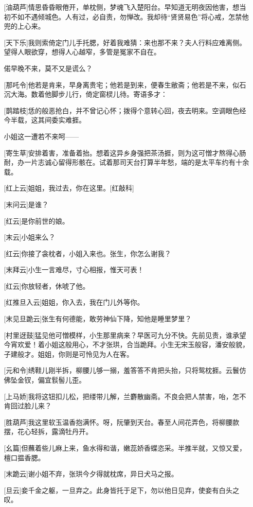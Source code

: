 \documentclass{book}
\begin{document}
[油葫芦]情思昏昏眼倦开，单枕侧，梦魂飞入楚阳台。早知道无明夜因他害，想当初不如不遇倾城色。人有过，必自责，勿惮改。我却待``贤贤易色''将心戒，怎禁他兜的上心来。

[天下乐]我则索倚定门儿手托腮，好着我难猜：来也那不来？夫人行料应难离侧。望得人眼欲穿，想得人心越窄，多管是冤家不自在。

偌早晚不来，莫不又是谎么？

[那吒令]他若是肯来，早身离贵宅；他若是到来，便春生敝斋；他若是不来，似石沉大海。数着他脚步儿行，倚定窗棂儿待。寄语多才：

[鹊踏枝]恁的般恶抢白，并不曾记心怀；拨得个意转心回，夜去明来。空调眼色经今半载，这其间委实难捱。

小姐这一遭若不来呵——

[寄生草]安排着害，准备着抬。想着这异乡身强把茶汤捱，则为这可憎才熬得心肠耐，办一片志诚心留得形骸在。试着那司天台打算半年愁，端的是太平车约有十余载。

[红上云]姐姐，我过去，你在这里。[红敲科]

[末问云]是谁？

[红云]是你前世的娘。

[末云]小姐来么？

[红云]你接了衾枕者，小姐入来也。张生，你怎么谢我？

[末拜云]小生一言难尽，寸心相报，惟天可表！

[红云]你放轻者，休唬了他。

[红推旦入云]姐姐，你入去，我在门儿外等你。

[末见旦跪云]张生有何德能，敢劳神仙下降，知他是睡里梦里？

[村里迓鼓]猛见他可憎模样，小生那里病来？早医可九分不快。先前见责，谁承望今宵欢爱！着小姐这般用心，不才张珙，合当跪拜。小生无宋玉般容，潘安般貌，子建般才。姐姐，你则是可怜见为人在客。

[元和令]绣鞋儿刚半拆，柳腰儿够一搦，羞答答不肯把头抬，只将鸳枕捱。云鬟仿佛坠金钗，偏宜䯼髻儿歪。

[上马娇]我将这钮扣儿松，把缕带儿解，兰麝散幽斋。不良会把人禁害，咍，怎不肯回过脸儿来？

[胜葫芦]我这里软玉温香抱满怀。呀，阮肇到天台。春至人间花弄色，将柳腰款摆，花心轻拆，露滴牡丹开。

[幺篇]但蘸着些儿麻上来，鱼水得和谐，嫩蕊娇香蝶恣采。半推半就，又惊又爱，檀口揾香腮。

[末跪云]谢小姐不弃，张珙今夕得就枕席，异日犬马之报。

[旦云]妾千金之躯，一旦弃之。此身皆托于足下，勿以他日见弃，使妾有白头之叹。
\end{document}
